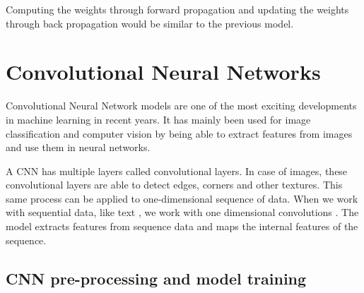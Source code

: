 Computing the weights through forward propagation and updating the weights through back propagation would be similar to the previous model.

\section{Convolutional Neural Networks}

Convolutional Neural Network models \cite{krizhevsky2012imagenet} are one of the most exciting developments in machine learning in recent years. It has mainly been used for image classification \cite{lawrence1997face} and computer vision \cite{karpathy2014large} by being able to extract features from images and use them in neural networks.

A CNN has multiple layers called convolutional layers. In case of images, these convolutional layers are able to detect edges, corners and other textures. This same process can be applied to one-dimensional sequence of data. When we work with sequential data, like text \cite{kim2014convolutional} \cite{kalchbrenner2014convolutional}, we work with one dimensional convolutions \cite{hughes2017medical}. The model extracts features from sequence data and maps the internal features of the sequence.

\subsection{CNN pre-processing and model training}

